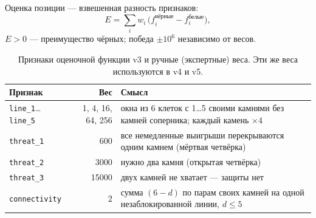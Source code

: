 \documentclass[a4paper,10pt,twocolumn]{article}
\newcommand{\code}[1]{\texttt{#1}}
\begin{document}
Оценка позиции --- взвешенная разность признаков:
\begin{equation}
E=\sum_{i} w_i\,\bigl(f_i^{\text{чёрные}}-f_i^{\text{белые}}\bigr),
\label{eq:eval}
\end{equation}
$E>0$ --- преимущество чёрных; победа $\pm10^6$ независимо от весов.

\begin{table}[t]
\centering
\caption{Признаки оценочной функции v3 и ручные (экспертные) веса. Эти же веса используются в v4 и v5.}
\label{tab:features}
\begin{tabularx}{\textwidth}{@{}lrX@{}}
\toprule
Признак & Вес & Смысл \\
\midrule
\code{line\_1}\ldots\code{line\_5} & 1, 4, 16, 64, 256 & окна из 6 клеток с 1\ldots5 своими камнями без камней соперника; каждый камень $\times4$ \\
\code{threat\_1} & 600 & все немедленные выигрыши перекрываются одним камнем (мёртвая четвёрка) \\
\code{threat\_2} & 3000 & нужно два камня (открытая четвёрка) \\
\code{threat\_3} & 15000 & двух камней не хватает --- защиты нет \\
\code{connectivity} & 2 & сумма $(6-d)$ по парам своих камней на одной незаблокированной линии, $d\le5$ \\
\bottomrule
\end{tabularx}
\end{table}
\end{document}
